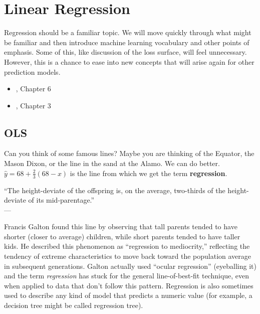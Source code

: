 \section{Linear Regression}

Regression should be a familiar topic. We will move quickly through what might be familiar and then introduce machine learning vocabulary and other points of emphasis. Some of this, like discussion of the loss surface, will feel unnecessary. However, this is a chance to ease into new concepts that will arise again for other prediction models.

\begin{readingbox}
\begin{itemize}
\item \cite{kuhn2013applied}, Chapter 6
\item \cite{hastie2009elements}, Chapter 3
\end{itemize}
\end{readingbox}

\subsection{OLS}

Can you think of some famous lines? Maybe you are thinking of the Equator, the Mason Dixon, or the line in the sand at the Alamo. We can do better. $\hat{y} = 68 + \frac{2}{3}(68-x)$ is the line from which we get the term \textbf{regression}.

\begin{displayquote}
``The height-deviate of the offspring is, on the average, two-thirds of the height-deviate of its mid-parentage.''\\
--- \cite{galton1886regression}
\end{displayquote}

Francis Galton found this line by observing that tall parents tended to have shorter (closer to average) children, while short parents tended to have taller kids. He described this phenomenon as ``regression to mediocrity,'' reflecting the tendency of extreme characteristics to move back toward the population average in subsequent generations. Galton actually used ``ocular regression'' (eyeballing it) and the term \textit{regression} has stuck for the general line-of-best-fit technique, even when applied to data that don't follow this pattern. Regression is also sometimes used to describe any kind of model that predicts a numeric value (for example, a decision tree might be called regression tree).

